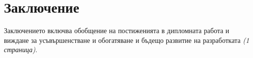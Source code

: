 \chapter*{Заключение}

Заключението включва обобщение на постиженията в дипломната работа и виждане за усъвършенстване и обогатяване и бъдещо развитие на разработката \emph{(1 страница)}.